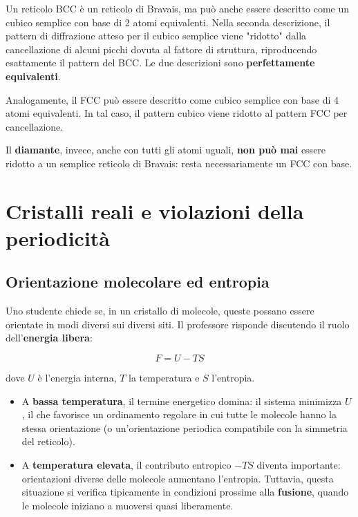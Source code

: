 \begin{nota}
Un reticolo BCC è un reticolo di Bravais, ma può anche essere descritto come un cubico semplice con base di 2 atomi equivalenti. Nella seconda descrizione, il pattern di diffrazione atteso per il cubico semplice viene "ridotto" dalla cancellazione di alcuni picchi dovuta al fattore di struttura, riproducendo esattamente il pattern del BCC. Le due descrizioni sono \textbf{perfettamente equivalenti}.

Analogamente, il FCC può essere descritto come cubico semplice con base di 4 atomi equivalenti. In tal caso, il pattern cubico viene ridotto al pattern FCC per cancellazione.

Il \textbf{diamante}, invece, anche con tutti gli atomi uguali, \textbf{non può mai} essere ridotto a un semplice reticolo di Bravais: resta necessariamente un FCC con base.
\end{nota}

\section{Cristalli reali e violazioni della periodicità}

\subsection*{Orientazione molecolare ed entropia}

Uno studente chiede se, in un cristallo di molecole, queste possano essere orientate in modi diversi sui diversi siti. Il professore risponde discutendo il ruolo dell'\textbf{energia libera}:

$$F = U - TS$$

dove $U$ è l'energia interna, $T$ la temperatura e $S$ l'entropia.

\begin{itemize}
    \item A \textbf{bassa temperatura}, il termine energetico domina: il sistema minimizza $U$, il che favorisce un ordinamento regolare in cui tutte le molecole hanno la stessa orientazione (o un'orientazione periodica compatibile con la simmetria del reticolo).
    \item A \textbf{temperatura elevata}, il contributo entropico $-TS$ diventa importante: orientazioni diverse delle molecole aumentano l'entropia. Tuttavia, questa situazione si verifica tipicamente in condizioni prossime alla \textbf{fusione}, quando le molecole iniziano a muoversi quasi liberamente.
\end{itemize}


